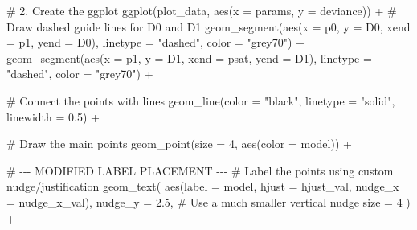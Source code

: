 \documentclass[
  letterpaper,
  DIV=11,
  numbers=noendperiod]{scrreprt}
\newenvironment{Shaded}{\begin{snugshade}}{\end{snugshade}}
\newcommand{\AttributeTok}[1]{\textcolor[rgb]{0.40,0.45,0.13}{#1}}
\newcommand{\CommentTok}[1]{\textcolor[rgb]{0.37,0.37,0.37}{#1}}
\newcommand{\DecValTok}[1]{\textcolor[rgb]{0.68,0.00,0.00}{#1}}
\newcommand{\FloatTok}[1]{\textcolor[rgb]{0.68,0.00,0.00}{#1}}
\newcommand{\FunctionTok}[1]{\textcolor[rgb]{0.28,0.35,0.67}{#1}}
\newcommand{\NormalTok}[1]{\textcolor[rgb]{0.00,0.23,0.31}{#1}}
\newcommand{\SpecialCharTok}[1]{\textcolor[rgb]{0.37,0.37,0.37}{#1}}
\newcommand{\StringTok}[1]{\textcolor[rgb]{0.13,0.47,0.30}{#1}}
\begin{document}
\begin{Shaded}
\begin{Highlighting}[]
\CommentTok{\# 2. Create the ggplot}
\FunctionTok{ggplot}\NormalTok{(plot\_data, }\FunctionTok{aes}\NormalTok{(}\AttributeTok{x =}\NormalTok{ params, }\AttributeTok{y =}\NormalTok{ deviance)) }\SpecialCharTok{+}
  \CommentTok{\# Draw dashed guide lines for D0 and D1}
  \FunctionTok{geom\_segment}\NormalTok{(}\FunctionTok{aes}\NormalTok{(}\AttributeTok{x =}\NormalTok{ p0, }\AttributeTok{y =}\NormalTok{ D0, }\AttributeTok{xend =}\NormalTok{ p1, }\AttributeTok{yend =}\NormalTok{ D0), }\AttributeTok{linetype =} \StringTok{"dashed"}\NormalTok{, }\AttributeTok{color =} \StringTok{"grey70"}\NormalTok{) }\SpecialCharTok{+}
  \FunctionTok{geom\_segment}\NormalTok{(}\FunctionTok{aes}\NormalTok{(}\AttributeTok{x =}\NormalTok{ p1, }\AttributeTok{y =}\NormalTok{ D1, }\AttributeTok{xend =}\NormalTok{ psat, }\AttributeTok{yend =}\NormalTok{ D1), }\AttributeTok{linetype =} \StringTok{"dashed"}\NormalTok{, }\AttributeTok{color =} \StringTok{"grey70"}\NormalTok{) }\SpecialCharTok{+}
  
  \CommentTok{\# Connect the points with lines}
  \FunctionTok{geom\_line}\NormalTok{(}\AttributeTok{color =} \StringTok{"black"}\NormalTok{, }\AttributeTok{linetype =} \StringTok{"solid"}\NormalTok{, }\AttributeTok{linewidth =} \FloatTok{0.5}\NormalTok{) }\SpecialCharTok{+}
  
  \CommentTok{\# Draw the main points}
  \FunctionTok{geom\_point}\NormalTok{(}\AttributeTok{size =} \DecValTok{4}\NormalTok{, }\FunctionTok{aes}\NormalTok{(}\AttributeTok{color =}\NormalTok{ model)) }\SpecialCharTok{+}
  
  \CommentTok{\# {-}{-}{-} MODIFIED LABEL PLACEMENT {-}{-}{-}}
  \CommentTok{\# Label the points using custom nudge/justification}
  \FunctionTok{geom\_text}\NormalTok{(}
    \FunctionTok{aes}\NormalTok{(}\AttributeTok{label =}\NormalTok{ model, }\AttributeTok{hjust =}\NormalTok{ hjust\_val, }\AttributeTok{nudge\_x =}\NormalTok{ nudge\_x\_val), }
    \AttributeTok{nudge\_y =} \FloatTok{2.5}\NormalTok{,  }\CommentTok{\# Use a much smaller vertical nudge}
    \AttributeTok{size =} \DecValTok{4}
\NormalTok{  ) }\SpecialCharTok{+}
  

\end{Highlighting}
\end{Shaded}
\end{document}
